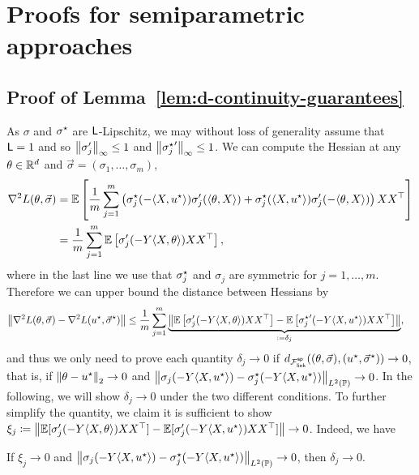 \section{Proofs for semiparametric approaches}

\subsection{Proof of Lemma~\ref{lem:d-continuity-guarantees}}
\label{proof:d-continuity-guarantees}

As $\sigma$ and $\sigma^\star$ are $\mathsf{L}$-Lipschitz, we may without loss
of generality assume that $\mathsf{L} = 1$ and so $\left\|{\sigma_j'}\right\|_\infty \le 1$
and $\left\|{{\sigma^\star_j}'}\right\|_\infty \le 1$.  We can compute the Hessian at any
$\theta \in \mathbb{R}^d$ and $\vec{\sigma} = (\sigma_1, \dots, \sigma_m)$,
\begin{align*}
  \nabla^2 L(\theta, \vec{\sigma}) & = \mathbb{E}\left[\frac{1}{m}
    \sum_{j = 1}^m \left(\sigma^\star_j(-\langle X, u^\star\rangle) \sigma_j'(\langle\theta, X\rangle)
    + \sigma^\star_j(\langle X, u^\star\rangle) \sigma_j'(-\langle\theta, X\rangle)\right) X X^\top \right] \\
  & = \frac{1}{m} \sum_{j = 1}^m \mathbb{E}\left[\sigma_j'(-Y\langle X, \theta\rangle) XX^\top\right],
\end{align*}
where in the last line we use that $\sigma_j^\star$ and $\sigma_j$ are symmetric for $j=1,\dots, m$. Therefore we can upper bound the distance between Hessians by
\begin{align*}
	\left\|{\nabla^2 L(\theta, \vec{\sigma}) - \nabla^2 L(u^\star, \vec{\sigma}^\star)}\right\| & \leq \frac{1}{m} \sum_{j = 1}^m \underbrace{\left\|{\mathbb{E}\left[\sigma_j'(-Y\langle X, \theta\rangle) XX^\top\right] - \mathbb{E}\left[{\sigma_j^\star}'(-Y\langle X, u^\star\rangle) XX^\top\right]  }\right\|}_{:=\delta_j},
\end{align*}
and thus we only need to prove each quantity $\delta_j \to 0$ if
$d_{\mathcal{F}_{\mathsf{link}}^{\mathsf{sp}}}((\theta, \vec{\sigma}), (u^\star, \vec{\sigma}^\star)) \to 0$,
that is, if $\left\|{\theta - u^\star}\right\|_2 \to 0$ and $\left\|{\sigma_j(-Y\langle X,
  u^\star\rangle) - \sigma_j^\star(-Y\langle X, u^\star\rangle)}\right\|_{L^2(\mathbb{P})} \to 0$. In the following, we will
show $\delta_j \to 0$ under the two different conditions. To further
simplify the quantity, we claim it is sufficient to show $\xi_j \coloneqq
\left\|{\mathbb{E}[\sigma_j'(-Y\langle X, \theta\rangle) XX^\top] -
  \mathbb{E}[\sigma_j'(-Y\langle X, u^\star\rangle) XX^\top]}\right\| \to 0$. Indeed, we have
\begin{lemma}
  If $\xi_j \to 0$ and $\left\|{\sigma_j(-Y\langle X, u^\star\rangle) -
    \sigma_j^\star(-Y\langle X, u^\star\rangle)}\right\|_{L^2(\mathbb{P})} \to 0$, then $\delta_j \to 0$.
\end{lemma}
